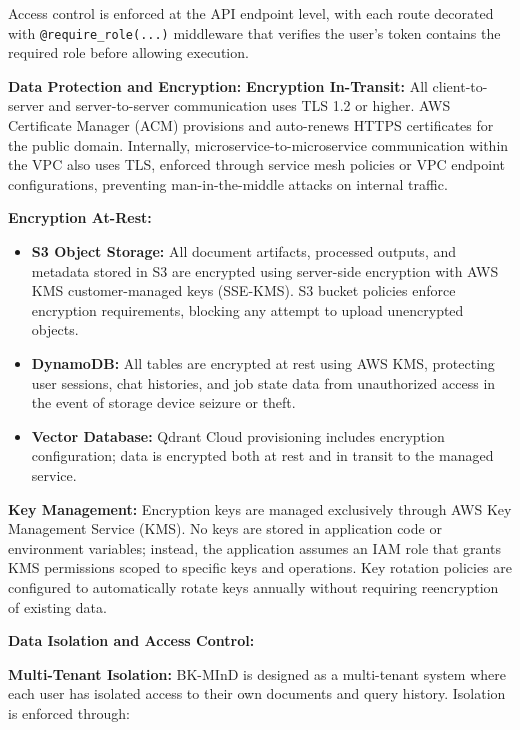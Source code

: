 Access control is enforced at the API endpoint level, with each route decorated with \texttt{@require\_role(...)} middleware that verifies the user's token contains the required role before allowing execution.

\textbf{Data Protection and Encryption:} \textbf{Encryption In-Transit:} All client-to-server and server-to-server communication uses TLS 1.2 or higher. AWS Certificate Manager (ACM) provisions and auto-renews HTTPS certificates for the public domain. Internally, microservice-to-microservice communication within the VPC also uses TLS, enforced through service mesh policies or VPC endpoint configurations, preventing man-in-the-middle attacks on internal traffic.

\textbf{Encryption At-Rest:}
\begin{itemize}
    \item \textbf{S3 Object Storage:} All document artifacts, processed outputs, and metadata stored in S3 are encrypted using server-side encryption with AWS KMS customer-managed keys (SSE-KMS). S3 bucket policies enforce encryption requirements, blocking any attempt to upload unencrypted objects.
    \item \textbf{DynamoDB:} All tables are encrypted at rest using AWS KMS, protecting user sessions, chat histories, and job state data from unauthorized access in the event of storage device seizure or theft.
    \item \textbf{Vector Database:} Qdrant Cloud provisioning includes encryption configuration; data is encrypted both at rest and in transit to the managed service.
\end{itemize}

\textbf{Key Management:} Encryption keys are managed exclusively through AWS Key Management Service (KMS). No keys are stored in application code or environment variables; instead, the application assumes an IAM role that grants KMS permissions scoped to specific keys and operations. Key rotation policies are configured to automatically rotate keys annually without requiring reencryption of existing data.

\textbf{Data Isolation and Access Control:}

\textbf{Multi-Tenant Isolation:} BK-MInD is designed as a multi-tenant system where each user has isolated access to their own documents and query history. Isolation is enforced through:

